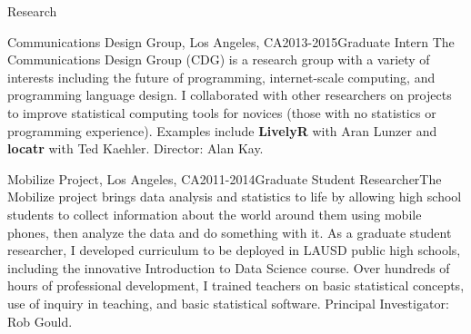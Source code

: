 \documentclass{resume} %
\begin{document}


\begin{rSection}{Research}

\begin{pSubsection}{Communications Design Group, }{Los Angeles, CA}{2013-2015}{Graduate Intern}
{The Communications Design Group (CDG) is a research group with a variety of interests including the future of programming, internet-scale computing, and programming language design. I collaborated with other researchers on projects to improve statistical computing tools for novices (those with no statistics or programming experience). Examples include \textbf{LivelyR} with Aran Lunzer and \textbf{locatr} with Ted Kaehler. Director: Alan Kay.}
\end{pSubsection}


\begin{pSubsection}{Mobilize Project, }{Los Angeles, CA}{2011-2014}{Graduate Student Researcher}{The Mobilize project brings data analysis and statistics to life by allowing high school students to collect information about the world around them using mobile phones, then analyze the data and do something with it. As a graduate student researcher, I developed curriculum to be deployed in LAUSD public high schools, including the innovative Introduction to Data Science course. Over hundreds of hours of professional development, I trained teachers on basic statistical concepts, use of inquiry in teaching, and basic statistical software. Principal Investigator: Rob Gould.}
\end{pSubsection}


%
%
\end{rSection}
\end{document}
